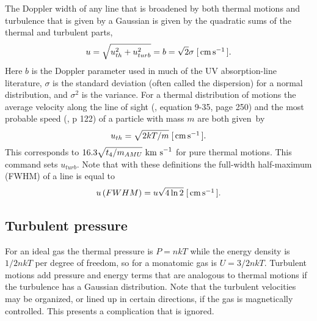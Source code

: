 The Doppler width of any line that is broadened by both thermal motions
and turbulence that is given by a Gaussian is given by the quadratic sums
of the thermal and turbulent parts,
\begin{equation}
u = \sqrt {u_{th}^2  + u_{turb}^2 }  = b = \sqrt 2 \sigma\;
 [\mbox{${\rm\thinspace cm}{\rm\thinspace s}^{-1}\,$} ].
\end{equation}
Here $b$ is the Doppler parameter used in much of the UV absorption-line
literature, $\sigma $ is the standard deviation
(often called the dispersion) for
a normal distribution, and $\sigma^2$ is the variance.
For a thermal distribution
of motions the average velocity along the line of sight
(\citealp{Mihalas1978}, equation 9-35, page 250)
and the most probable speed (\citealp{Novotny1973}, p 122)
of a particle with mass $m$ are both given~by
\begin{equation}
u_{th}  = \sqrt {2kT/m}\;
[\mbox{${\rm\thinspace cm}{\rm\thinspace s}^{-1}\,$} ].
\end{equation}
This corresponds to $16.3 \sqrt{ t_4/m_{AMU}}\ {\rm km\ s}^{-1}$ for pure thermal motions.
This command sets $u_{turb}$.
Note that with these definitions the full-width half-maximum
(FWHM) of a line is equal to
\begin{equation}
u\left( {FWHM} \right) = u\sqrt {4\ln 2}\;
[\mbox{${\rm\thinspace cm}{\rm\thinspace s}^{-1}\,$} ].
\end{equation}

\subsection{Turbulent pressure}

For an ideal gas the thermal pressure is $P = nkT$
while the energy density is $1/2 nkT$
per degree of freedom, so for a monatomic gas is $U = 3/2 nkT$.
Turbulent motions add pressure and energy terms that are analogous
to thermal motions if the turbulence has a Gaussian distribution.
Note
that the turbulent velocities may be organized, or lined up in certain
directions, if the gas is magnetically controlled.
This presents a
complication that is ignored.

